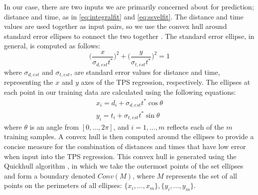 \documentclass[letterpaper, 10 pt, conference]{ieeeconf}  %
\newcommand\NB[1]{$\spadesuit$\footnote{NB: #1}}
\begin{document}
In our case, there are two inputs we are primarily concerned about for prediction; distance and time, as in \eqref{eq:integralfit} and \eqref{eq:ssvelfit}. The distance and time values are used together as input pairs, so we use the convex hull around standard error ellipses to connect the two together \cite{stdellipse}. The standard error ellipse, in general, is computed as follows: %
\begin{equation}
    \bigg(\frac{x}{\sigma_{d,est}t^*}\bigg)^2 + \bigg(\frac{y}{\sigma_{t,est}t^*}\bigg)^2 = 1
\end{equation}
where $\sigma_{d,est}$ and $\sigma_{t,est}$, are standard error values for distance and time, representing the $x$ and $y$ axes of the TPS regression, respectively. The ellipses at each point in our training data are calculated using the following equations:
\begin{align} \label{eq:bounds}
    x_i = d_i + \sigma_{d,est}t^*\cos{\theta} \nonumber \\
    y_i = t_i + \sigma_{t,est}t^*\sin{\theta} 
\end{align}
where $\theta$ is an angle from $[0,\ldots,2\pi]$, and $i = 1,\ldots,m$ reflects each of the $m$ training samples. A convex hull is then computed around the ellipses to provide a concise measure for the combination of distances and times that have low error when input into the TPS regression. This convex hull is generated using the Quickhull algorithm \cite{quickhull}, in which we take the outermost points of the set ellipses and form a boundary denoted $Conv(M)$, where $M$ represents the set of all points on the perimeters of all ellipses: $\{x_i,\ldots,x_m\},\{y_i,\ldots,y_m\}$.
\end{document}
